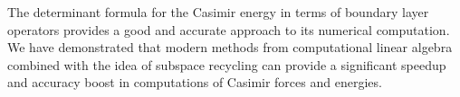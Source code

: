 The determinant formula for the Casimir energy in terms of boundary layer operators provides a good and accurate approach to its numerical computation.
We have demonstrated that modern methods from computational linear algebra combined with the idea of subspace recycling can provide a significant 
speedup and accuracy boost in computations of Casimir forces and energies.
